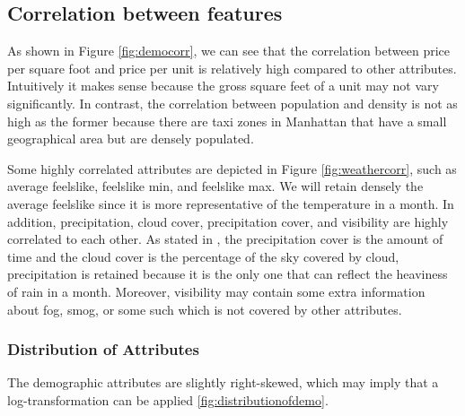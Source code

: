 \documentclass[11pt]{article}
\begin{document}
\subsection{Correlation between features}
As shown in Figure \ref{fig:democorr}, we can see that the correlation between price per square foot and price per unit is relatively high compared to other attributes. Intuitively it makes sense because the gross square feet of a unit may not vary significantly. In contrast, the correlation between population and density is not as high as the former because there are taxi zones in Manhattan that have a small geographical area but are densely populated. 

Some highly correlated attributes are depicted in Figure \ref{fig:weathercorr}, such as average feelslike, feelslike min, and feelslike max. We will retain densely the average feelslike since it is more representative of the temperature in a month. In addition, precipitation, cloud cover, precipitation cover, and visibility are highly correlated to each other. As stated in \cite{weathermetadata}, the precipitation cover is the amount of time and the cloud cover is the percentage of the sky covered by cloud, precipitation is retained because it is the only one that can reflect the heaviness of rain in a month. Moreover, visibility may contain some extra information about fog, smog, or some such which is not covered by other attributes. 
\subsubsection{Distribution of Attributes}
The demographic attributes are slightly right-skewed, which may imply that a log-transformation can be applied \ref{fig:distributionofdemo}.
\end{document}
